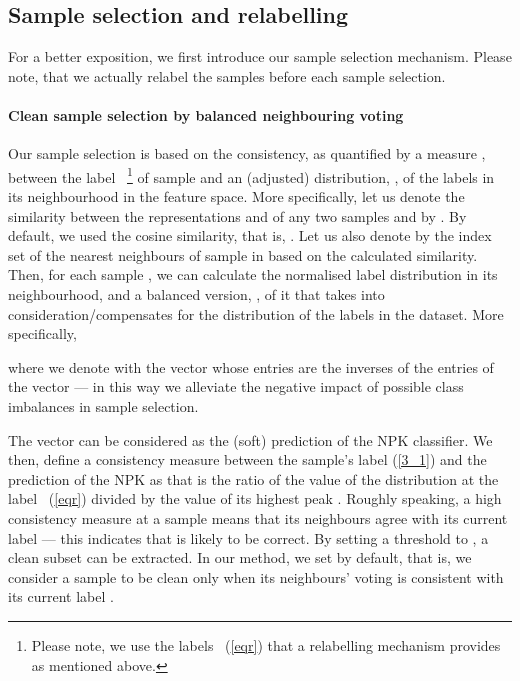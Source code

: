 \documentclass{bmvc2k}
\begin{document}
\subsection{Sample selection and relabelling}
\label{3_3}
For a better exposition, we first introduce our sample selection mechanism. Please note, that we actually relabel the samples before each sample selection. 

\paragraph{Clean sample selection by balanced neighbouring voting}

\label{3_3_1}
Our sample selection is based on the consistency, as quantified by a measure , between the label ~\footnote{Please note, we use the labels ~(\cref{eqr}) that a relabelling mechanism provides as mentioned above.} of sample  and an (adjusted) distribution, , of the labels in its neighbourhood in the feature space. More specifically, let us denote the similarity between the representations  and  of any two samples  and  by . By default, we used the cosine similarity, that is, .
Let us also denote by  the index set of the  nearest neighbours of sample  in  based on the calculated similarity. Then, for each sample , we can calculate the normalised label distribution  in its neighbourhood, and a balanced version, , of it that takes into consideration/compensates for the distribution  of the labels in the dataset. More specifically,

where we denote with  the vector whose entries are the inverses of the entries of the vector  --- in this way we alleviate the negative impact of possible class imbalances in sample selection.



The vector  can be considered as the (soft) prediction of the NPK  classifier. We then, define a consistency measure  between the sample's label  (\cref{3_1}) and the prediction  of the NPK as 
that is the ratio of the value of the distribution  at the label ~(\cref{eqr}) divided by the value of its highest peak . 
Roughly speaking, a high consistency measure  at a sample  means that its neighbours agree with its current label  --- this indicates that  is likely to be correct. By setting a threshold  to , a clean subset  can be extracted. In our method, we set  by default, that is, we consider a sample  to be clean only when its neighbours' voting  is consistent with its current label .
\end{document}
